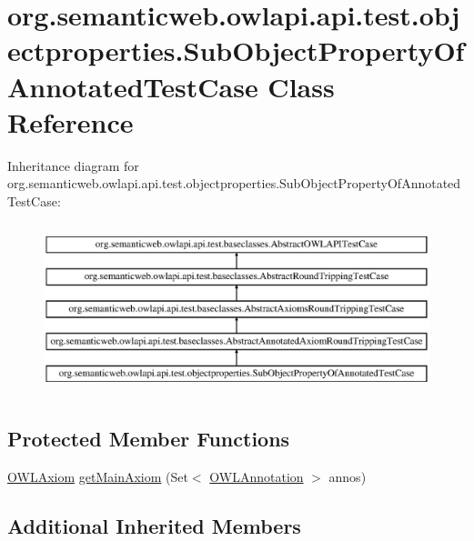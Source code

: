 \hypertarget{classorg_1_1semanticweb_1_1owlapi_1_1api_1_1test_1_1objectproperties_1_1_sub_object_property_of_annotated_test_case}{\section{org.\-semanticweb.\-owlapi.\-api.\-test.\-objectproperties.\-Sub\-Object\-Property\-Of\-Annotated\-Test\-Case Class Reference}
\label{classorg_1_1semanticweb_1_1owlapi_1_1api_1_1test_1_1objectproperties_1_1_sub_object_property_of_annotated_test_case}
}
Inheritance diagram for org.\-semanticweb.\-owlapi.\-api.\-test.\-objectproperties.\-Sub\-Object\-Property\-Of\-Annotated\-Test\-Case\-:\begin{figure}[H]
\begin{center}
\leavevmode
\includegraphics[height=5.000000cm]{classorg_1_1semanticweb_1_1owlapi_1_1api_1_1test_1_1objectproperties_1_1_sub_object_property_of_annotated_test_case}
\end{center}
\end{figure}
\subsection*{Protected Member Functions}
\begin{DoxyCompactItemize}
\item 
\hyperlink{interfaceorg_1_1semanticweb_1_1owlapi_1_1model_1_1_o_w_l_axiom}{O\-W\-L\-Axiom} \hyperlink{classorg_1_1semanticweb_1_1owlapi_1_1api_1_1test_1_1objectproperties_1_1_sub_object_property_of_annotated_test_case_a63ba6ff570b5e61b1a936b0601a73401}{get\-Main\-Axiom} (Set$<$ \hyperlink{interfaceorg_1_1semanticweb_1_1owlapi_1_1model_1_1_o_w_l_annotation}{O\-W\-L\-Annotation} $>$ annos)
\end{DoxyCompactItemize}
\subsection*{Additional Inherited Members}


